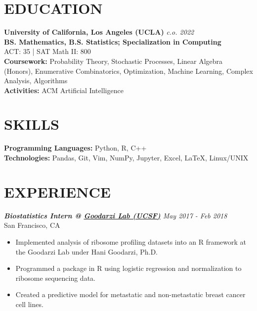 \documentclass[margin, 10pt]{res} %
\begin{document}
\begin{resume}


\section{\large EDUCATION}

{\bf University of California, Los Angeles (UCLA)} \hfill{\sl c.o. 2022}\\
{\sl}{\bf  BS. Mathematics, B.S. Statistics; Specialization in Computing}\\ ACT: 35 | SAT Math II: 800\\
{\bf Coursework:} Probability Theory, Stochastic Processes, Linear Algebra (Honors), Enumerative Combinatorics, Optimization, Machine Learning, Complex Analysis, Algorithms\\
{\bf Activities:} ACM Artificial Intelligence

\section{\large SKILLS} 

{\bf Programming Languages:} 
Python, R, C++\\ 
{\bf Technologies:}
Pandas, Git, Vim, NumPy,  Jupyter, Excel, {\LaTeX}, Linux/UNIX
 
\section{\large EXPERIENCE}

{\sl {\bf Biostatistics Intern @ \href {https://goodarzilab.ucsf.edu/}{Goodarzi Lab (UCSF)}} \hfill May 2017 - Feb 2018} \\
San Francisco, CA

\begin{itemize} \itemsep -1pt %
\item Implemented analysis of ribosome profiling datasets into an R framework at the Goodarzi Lab under Hani Goodarzi, Ph.D. 
\item Programmed a package in R using logistic regression and normalization to ribosome sequencing data.
\item Created a predictive model for metastatic and non-metastatic breast cancer cell lines.
\end{itemize}
 

\end{resume}
\end{document}
